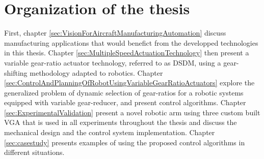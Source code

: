 \section{Organization of the thesis}
\label{sec:OrganisationOfTheThesis}

First, chapter \ref{sec:VisionForAircraftManufacturingAutomation} discuss manufacturing applications that would benefict from the developped technologies in this thesis. Chapter \ref{sec:MultipleSpeedActuationTechnology} then present a variable gear-ratio actuator technology, referred to as DSDM, using a gear-shifting methodology adapted to robotics. Chapter \ref{sec:ControlAndPlanningOfRobotUsingVariableGearRatioActuators} explore the generalized problem of dynamic selection of gear-ratios for a robotic systems equipped with variable gear-reducer, and present control algorithms. Chapter \ref{sec:ExperimentalValidation} present a novel robotic arm using three custom built VGA that is used in all experiments throughout the thesis and discuss the mechanical design and the control system implementation. Chapter \ref{sec:casestudy} presents examples of using the proposed control algorithms in different situations.


